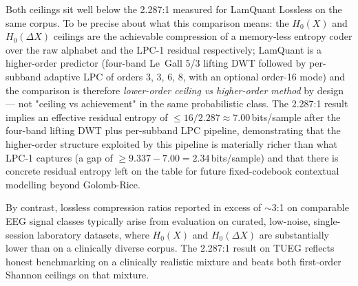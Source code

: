 \documentclass[journal]{IEEEtran}
\begin{document}
Both ceilings sit well below the 2.287:1 measured for LamQuant
Lossless on the same corpus. To be precise about what this
comparison means: the $H_0(X)$ and $H_0(\Delta X)$ ceilings are
the achievable compression of a memory-less entropy coder over
the raw alphabet and the LPC-1 residual respectively; LamQuant is
a higher-order predictor (four-band Le~Gall 5/3 lifting DWT
followed by per-subband adaptive LPC of orders 3, 3, 6, 8, with
an optional order-16 mode) and the comparison is therefore
\emph{lower-order ceiling vs higher-order method} by design — not
"ceiling vs achievement" in the same probabilistic class. The
2.287:1 result implies an effective residual entropy of $\leq
16/2.287 \approx 7.00$\,bits/sample after the four-band lifting
DWT plus per-subband LPC pipeline, demonstrating that the
higher-order structure exploited by this pipeline is materially
richer than what LPC-1 captures (a gap of $\geq 9.337 - 7.00 =
2.34$\,bits/sample) and that there is concrete residual entropy
left on the table for future fixed-codebook contextual modelling
beyond Golomb-Rice.

By contrast, lossless compression ratios reported in excess of
$\sim$3:1 on comparable EEG signal classes
\cite{sriraam2012} typically arise from evaluation on
curated, low-noise, single-session laboratory datasets, where
$H_0(X)$ and $H_0(\Delta X)$ are substantially lower than on a
clinically diverse corpus. The 2.287:1 result on TUEG reflects
honest benchmarking on a clinically realistic mixture and beats
both first-order Shannon ceilings on that mixture.
\end{document}
